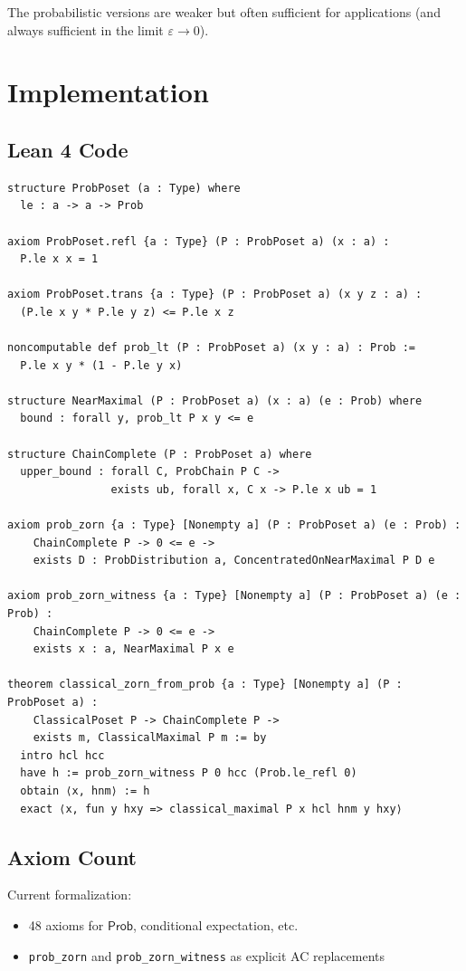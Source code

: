 \documentclass[11pt,a4paper]{article}
\newcommand{\Prob}{\mathsf{Prob}}
\begin{document}
The probabilistic versions are weaker but often sufficient for applications (and always sufficient in the limit $\varepsilon \to 0$).

\section{Implementation}

\subsection{Lean 4 Code}

\begin{verbatim}
structure ProbPoset (a : Type) where
  le : a -> a -> Prob

axiom ProbPoset.refl {a : Type} (P : ProbPoset a) (x : a) :
  P.le x x = 1

axiom ProbPoset.trans {a : Type} (P : ProbPoset a) (x y z : a) :
  (P.le x y * P.le y z) <= P.le x z

noncomputable def prob_lt (P : ProbPoset a) (x y : a) : Prob :=
  P.le x y * (1 - P.le y x)

structure NearMaximal (P : ProbPoset a) (x : a) (e : Prob) where
  bound : forall y, prob_lt P x y <= e

structure ChainComplete (P : ProbPoset a) where
  upper_bound : forall C, ProbChain P C ->
                exists ub, forall x, C x -> P.le x ub = 1

axiom prob_zorn {a : Type} [Nonempty a] (P : ProbPoset a) (e : Prob) :
    ChainComplete P -> 0 <= e ->
    exists D : ProbDistribution a, ConcentratedOnNearMaximal P D e

axiom prob_zorn_witness {a : Type} [Nonempty a] (P : ProbPoset a) (e : Prob) :
    ChainComplete P -> 0 <= e ->
    exists x : a, NearMaximal P x e

theorem classical_zorn_from_prob {a : Type} [Nonempty a] (P : ProbPoset a) :
    ClassicalPoset P -> ChainComplete P ->
    exists m, ClassicalMaximal P m := by
  intro hcl hcc
  have h := prob_zorn_witness P 0 hcc (Prob.le_refl 0)
  obtain ⟨x, hnm⟩ := h
  exact ⟨x, fun y hxy => classical_maximal P x hcl hnm y hxy⟩
\end{verbatim}

\subsection{Axiom Count}

Current formalization:
\begin{itemize}
    \item 48 axioms for $\Prob$, conditional expectation, etc.
    \item \texttt{prob\_zorn} and \texttt{prob\_zorn\_witness} as explicit AC replacements
\end{itemize}
\end{document}
